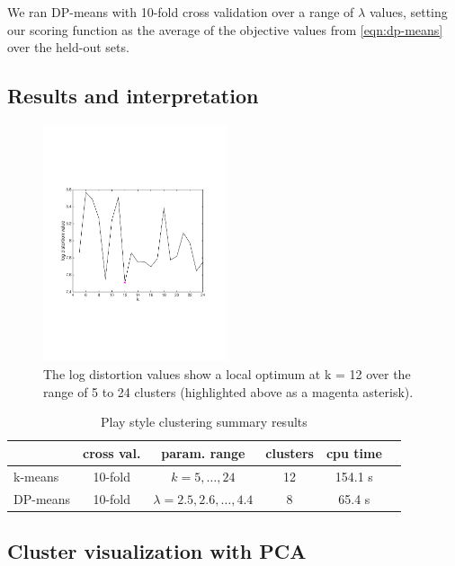 \documentclass[letterpaper,10 pt,conference]{ieeeconf}
\begin{document}
We ran DP-means with 10-fold cross validation over a range of $\lambda$ values, setting our scoring function as the average of the objective values from \eqref{eqn:dp-means} over the held-out sets.

\subsection{Results and interpretation}



\begin{figure}[htbp!]
  \centering
  \includegraphics[trim=55pt 200pt 70pt 200pt, clip, width=0.48\textwidth]{km-conv.pdf}
  \caption{The log distortion values show a local optimum at k = 12 over the range of 5 to 24 clusters (highlighted above as a magenta asterisk).}
  \label{fig:kmeans-conv}
\end{figure}

\begin{table}[htbp!]
  \centering
  \caption{Play style clustering summary results}
  \begin{tabular}{lccccc}
    \toprule
    & cross val. & param. range & clusters & cpu time \\ \midrule
    k-means & 10-fold & $k = 5, \ldots, 24$ & 12 & 154.1 s \\
    DP-means & 10-fold & $\lambda = 2.5,2.6,\ldots,4.4$ & 8 & 65.4 s \\
    \bottomrule
  \end{tabular}
  \label{tab:clus}
\end{table}

\subsection{Cluster visualization with PCA}
\end{document}
